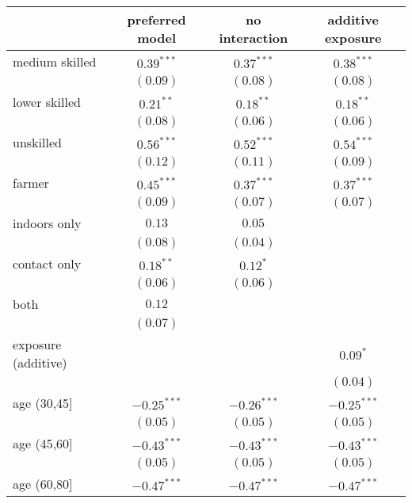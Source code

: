 
\begin{table}
\begin{center}
\begin{tabular}{l c c c}
\hline
 & preferred model & no interaction & additive exposure \\
\hline
medium skilled      & $0.39^{***}$  & $0.37^{***}$  & $0.38^{***}$  \\
                    & $(0.09)$      & $(0.08)$      & $(0.08)$      \\
lower skilled       & $0.21^{**}$   & $0.18^{**}$   & $0.18^{**}$   \\
                    & $(0.08)$      & $(0.06)$      & $(0.06)$      \\
unskilled           & $0.56^{***}$  & $0.52^{***}$  & $0.54^{***}$  \\
                    & $(0.12)$      & $(0.11)$      & $(0.09)$      \\
farmer              & $0.45^{***}$  & $0.37^{***}$  & $0.37^{***}$  \\
                    & $(0.09)$      & $(0.07)$      & $(0.07)$      \\
indoors only        & $0.13$        & $0.05$        &               \\
                    & $(0.08)$      & $(0.04)$      &               \\
contact only        & $0.18^{**}$   & $0.12^{*}$    &               \\
                    & $(0.06)$      & $(0.06)$      &               \\
both                & $0.12$        &               &               \\
                    & $(0.07)$      &               &               \\
exposure (additive) &               &               & $0.09^{*}$    \\
                    &               &               & $(0.04)$      \\
age (30,45]         & $-0.25^{***}$ & $-0.26^{***}$ & $-0.25^{***}$ \\
                    & $(0.05)$      & $(0.05)$      & $(0.05)$      \\
age (45,60]         & $-0.43^{***}$ & $-0.43^{***}$ & $-0.43^{***}$ \\
                    & $(0.05)$      & $(0.05)$      & $(0.05)$      \\
age (60,80]         & $-0.47^{***}$ & $-0.47^{***}$ & $-0.47^{***}$ \\

\end{tabular}
\end{center}
\end{table}
